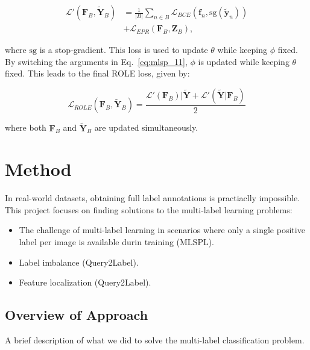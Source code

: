 \documentclass[lettersize,journal]{IEEEtran}
\begin{document}
\begin{equation}
    \label{eq:mlsp_11}
    \begin{aligned}
        \mathcal{L}'(\mathbf{F}_B,\tilde{\mathbf{Y}}_B) &= \frac{1}{|B|}\sum_{n\in B} \mathcal{L}_{BCE}(\mathbf{f}_n,\text{sg}(\tilde{\mathbf{y}}_n)) \\
        &+ \mathcal{L}_{EPR}(\mathbf{F}_B,\mathbf{Z}_B)\text{,}
    \end{aligned}
\end{equation}

\noindent where $\text{sg}$ is a stop-gradient. This loss is used to update $\theta$ while keeping $\phi$ fixed. By switching the arguments in Eq.~\ref{eq:mlsp_11}, $\phi$ is updated while keeping $\theta$ fixed. This leads to the final ROLE loss, given by:

\begin{equation}
    \mathcal{L}_{ROLE}(\mathbf{F}_B, \mathbf{\tilde{Y}}_B) = \frac{\mathcal{L}'(\mathbf{F}_B)|\mathbf{\tilde{Y}}+\mathcal{L}'(\mathbf{\tilde{Y}}|\mathbf{F}_B)}{2}
\end{equation}

\noindent where both $\mathbf{F}_B$ and $\tilde{\mathbf{Y}}_B$ are updated simultaneously.




\section{Method}

In real-world datasets, obtaining full label annotations is practiaclly impossible.
This project focuses on finding solutions to the multi-label learning problems:
\begin{itemize} 
    \item  The challenge of multi-label learning in scenarios where only a single positive label per image is available durin training (MLSPL).
    \item Label imbalance (Query2Label).
    \item Feature localization (Query2Label).
\end{itemize}

\subsection{Overview of Approach}
A brief description of what we did to solve the multi-label classification problem. 
\end{document}
